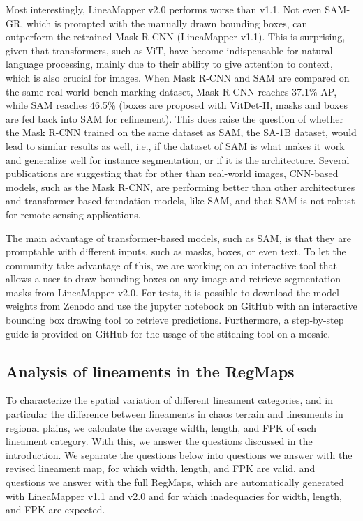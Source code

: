 Most interestingly, LineaMapper v2.0 performs worse than v1.1. Not even SAM-GR, which is prompted with the manually drawn bounding boxes, can outperform the retrained Mask R-CNN (LineaMapper v1.1). This is surprising, given that transformers, such as ViT, have become indispensable for natural language processing, mainly due to their ability to give attention to context, which is also crucial for images. When Mask R-CNN and SAM are compared on the same real-world bench-marking dataset, Mask R-CNN reaches 37.1\% AP, while SAM reaches 46.5\% (boxes are proposed with VitDet-H, masks and boxes are fed back into SAM for refinement).
This does raise the question of whether the Mask R-CNN trained on the same dataset as SAM, the SA-1B dataset, would lead to similar results as well, i.e., if the dataset of SAM is what makes it work and generalize well for instance segmentation, or if it is the architecture. Several publications are suggesting that for other than real-world images, CNN-based models, such as the Mask R-CNN, are performing better than other architectures and transformer-based foundation models, like SAM, and that SAM is not robust for remote sensing applications.  

The main advantage of transformer-based models, such as SAM, is that they are promptable with different inputs, such as masks, boxes, or even text. To let the community take advantage of this, we are working on an interactive tool that allows a user to draw bounding boxes on any image and retrieve segmentation masks from LineaMapper v2.0. For tests, it is possible to download the model weights from Zenodo and use the jupyter notebook on GitHub with an interactive bounding box drawing tool to retrieve predictions. Furthermore, a step-by-step guide is provided on GitHub for the usage of the stitching tool on a mosaic.

\subsection{Analysis of lineaments in the RegMaps}\label{sec:ALL_map_results}
To characterize the spatial variation of different lineament categories, and in particular the difference between lineaments in chaos terrain and lineaments in regional plains, we calculate the average width, length, and FPK of each lineament category. With this, we answer the questions discussed in the introduction. We separate the questions below into questions we answer with the revised lineament map, for which width, length, and FPK are valid, and questions we answer with the full RegMaps, which are automatically generated with LineaMapper v1.1 and v2.0 and for which inadequacies for width, length, and FPK are expected. 

